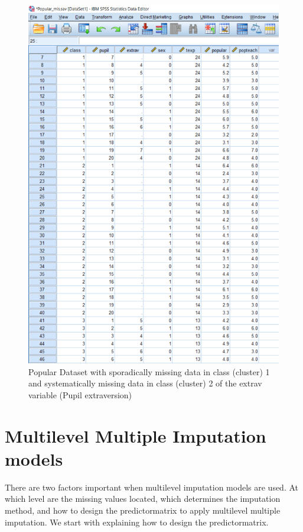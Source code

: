 \documentclass[
]{book}
\begin{document}
\begin{figure}

{\centering \includegraphics[width=0.9\linewidth]{images/fig7.20} 

}

\caption{Popular Dataset with sporadically missing data in class (cluster) 1 and systematically missing data in class (cluster) 2 of the extrav variable (Pupil extraversion)}\label{fig:fig85}
\end{figure}

\hypertarget{multilevel-multiple-imputation-models}{%
\section{Multilevel Multiple Imputation
models}\label{multilevel-multiple-imputation-models}}

There are two factors important when multilevel imputation models are
used. At which level are the missing values located, which determines
the imputation method, and how to design the predictormatrix to apply
multilevel multiple imputation. We start with explaining how to design
the predictormatrix.
\end{document}
